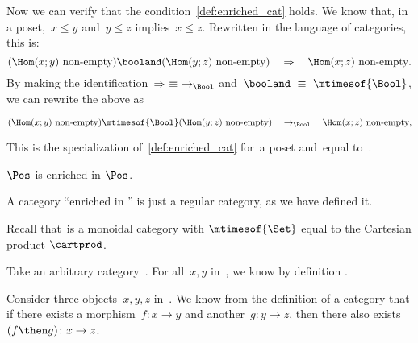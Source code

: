{\begin{example}
        Now we can verify that the condition~\cref{def:enriched_cat} holds.
        We know that, in a poset,~$x \leq y$ and~$y \leq z$ implies~$x \leq z$.
        Rewritten in the language of categories, this is:
        \begin{equation}
            (\Hom(x;y)\ \text{non-empty})
            \booland
            (\Hom(y; z)\ \text{non-empty})
            \quad
            \Rightarrow
            \quad
            \Hom(x; z)\ \text{non-empty}.
        \end{equation}
        By making the identification~$\Rightarrow\ \equiv\ \to_{\Bool}$ and~$\booland\ \equiv\ \mtimesof{\Bool}$, we can rewrite the above as
        \begin{widepar}
            \begin{equation}
                (\Hom(x;y)\ \text{non-empty})
                \mtimesof{\Bool}
                (\Hom(y; z)\ \text{non-empty})
                \quad
                \to_{\Bool}
                \quad
                \Hom(x; z)\ \text{non-empty},
            \end{equation}
        \end{widepar}
        This is the specialization of~\cref{def:enriched_cat} for~\CatC a poset and~\CatD equal to~\Bool.
    \end{example}
    \begin{example}
        $\Pos$ is enriched in $\Pos$.
    \end{example}

    \begin{example}
    \end{example}

    \begin{example}
        A category ``enriched in \Set'' is just a regular category, as we have defined it.

        Recall that~\Set is a monoidal category with $\mtimesof{\Set}$ equal to the Cartesian product $\cartprod$.

        Take an arbitrary category~\CatC.
        For all~$x, y$ in~\CatC, we know by definition .

        Consider three objects~$x,y,z$ in~\CatC.
        We know from the definition of a category that if there exists a morphism~$f: x \to y$ and another~$g: y \to z$, then there also exists~$(f\then g)\colon x \to z$.


\end{example}}
